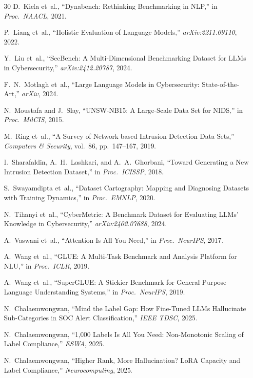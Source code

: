 \documentclass[journal]{IEEEtran}
\begin{document}
\begin{thebibliography}{30}
D.~Kiela et~al., ``Dynabench: Rethinking Benchmarking in NLP,'' in \emph{Proc.\ NAACL}, 2021.

P.~Liang et~al., ``Holistic Evaluation of Language Models,'' \emph{arXiv:2211.09110}, 2022.

Y.~Liu et~al., ``SecBench: A Multi-Dimensional Benchmarking Dataset for LLMs in Cybersecurity,'' \emph{arXiv:2412.20787}, 2024.

F.~N.~Motlagh et~al., ``Large Language Models in Cybersecurity: State-of-the-Art,'' \emph{arXiv}, 2024.

N.~Moustafa and J.~Slay, ``UNSW-NB15: A Large-Scale Data Set for NIDS,'' in \emph{Proc.\ MilCIS}, 2015.

M.~Ring et~al., ``A Survey of Network-based Intrusion Detection Data Sets,'' \emph{Computers \& Security}, vol.~86, pp.~147--167, 2019.

I.~Sharafaldin, A.~H.~Lashkari, and A.~A.~Ghorbani, ``Toward Generating a New Intrusion Detection Dataset,'' in \emph{Proc.\ ICISSP}, 2018.

S.~Swayamdipta et~al., ``Dataset Cartography: Mapping and Diagnosing Datasets with Training Dynamics,'' in \emph{Proc.\ EMNLP}, 2020.

N.~Tihanyi et~al., ``CyberMetric: A Benchmark Dataset for Evaluating LLMs' Knowledge in Cybersecurity,'' \emph{arXiv:2402.07688}, 2024.

A.~Vaswani et~al., ``Attention Is All You Need,'' in \emph{Proc.\ NeurIPS}, 2017.

A.~Wang et~al., ``GLUE: A Multi-Task Benchmark and Analysis Platform for NLU,'' in \emph{Proc.\ ICLR}, 2019.

A.~Wang et~al., ``SuperGLUE: A Stickier Benchmark for General-Purpose Language Understanding Systems,'' in \emph{Proc.\ NeurIPS}, 2019.

N.~Chalaemwongwan, ``Mind the Label Gap: How Fine-Tuned LLMs Hallucinate Sub-Categories in SOC Alert Classification,'' \emph{IEEE TDSC}, 2025.

N.~Chalaemwongwan, ``1,000 Labels Is All You Need: Non-Monotonic Scaling of Label Compliance,'' \emph{ESWA}, 2025.

N.~Chalaemwongwan, ``Higher Rank, More Hallucination? LoRA Capacity and Label Compliance,'' \emph{Neurocomputing}, 2025.

\end{thebibliography}
\end{document}
